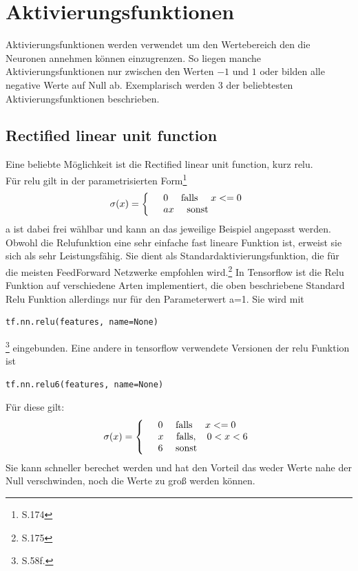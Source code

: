 \section{Aktivierungsfunktionen}
Aktivierungsfunktionen werden verwendet um den Wertebereich den die Neuronen annehmen können einzugrenzen. So liegen manche Aktivierungsfunktionen nur zwischen den Werten $-1$ und $1$ oder bilden alle negative Werte auf Null ab. Exemplarisch werden 3 der beliebtesten Aktivierungsfunktionen beschrieben.
\subsection{Rectified linear unit function}
Eine beliebte Möglichkeit ist die Rectified linear unit function, kurz relu.\\
Für relu gilt in der parametrisierten Form\footnote{\cite{Goodfellow}S.174 }
\begin{align*}
\sigma(x)=
\left\{
\begin{array}{l l}
& 0 \quad \text{   falls  } \quad x <= 0  \\ 
& ax \quad \text{   sonst}
\end{array}
\right.
\end{align*}
a ist dabei frei wählbar und kann an das jeweilige Beispiel angepasst werden. Obwohl die Relufunktion eine sehr einfache fast lineare Funktion ist, erweist sie sich als sehr Leistungsfähig. Sie dient als Standardaktivierungsfunktion, die für die meisten FeedForward Netzwerke empfohlen wird.\footnote{\cite{Goodfellow}S.175 } In Tensorflow ist die Relu Funktion auf verschiedene Arten implementiert, die oben beschriebene Standard Relu Funktion allerdings nur für den Parameterwert a=1. Sie wird mit
\begin{lstlisting}
tf.nn.relu(features, name=None)
\end{lstlisting}\footnote{\cite{cookbook}S.58f.} 
eingebunden.
Eine andere in tensorflow verwendete Versionen der relu Funktion ist
\begin{lstlisting}
tf.nn.relu6(features, name=None)
\end{lstlisting}\cite{cookbook}
Für diese gilt:
\begin{align*}
	\sigma(x)=
	\left\{
	\begin{array}{l l}
		& 0 \quad \text{   falls  } \quad x <= 0  \\ 
		& x \quad \text{   falls},\quad 0 < x < 6 \\
		& 6 \quad \text{   sonst}
	\end{array}
	\right.
\end{align*}
Sie kann schneller berechet werden und hat den Vorteil das weder Werte nahe der Null verschwinden, noch die Werte zu groß werden können.\cite{cookbook} 
